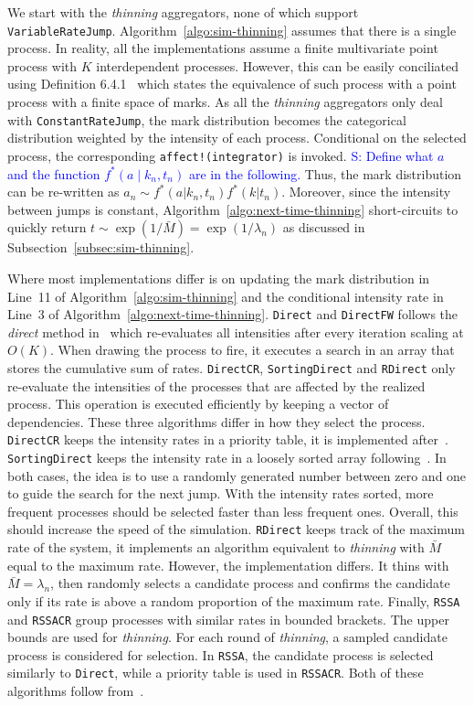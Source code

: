 \documentclass{juliacon}
\newcommand{\comment}[1]{\textcolor{blue}{#1}}
\begin{document}
We start with the \textit{thinning} aggregators, none of which support \texttt{VariableRateJump}. Algorithm~\ref{algo:sim-thinning} assumes that there is a single process. In reality, all the implementations assume a finite multivariate point process with \( K \) interdependent processes. However, this can be easily conciliated using Definition 6.4.1~\cite{daley2003} which states the equivalence of such process with a point process with a finite space of marks. As all the \textit{thinning} aggregators only deal with \texttt{ConstantRateJump}, the mark distribution becomes the categorical distribution weighted by the intensity of each process. Conditional on the selected process, the corresponding \texttt{affect!(integrator)} is invoked. \comment{S: Define what $a$ and the function $f^*(a \mid k_n, t_n)$ are in the following.} Thus, the mark distribution can be re-written as \( a_n \sim f^\ast(a | k_n, t_n)  f^\ast(k | t_n) \). Moreover, since the intensity between jumps is constant, Algorithm~\ref{algo:next-time-thinning} short-circuits to quickly return \( t \sim \exp(1 / \bar{M}) = \exp( 1 / \lambda_n ) \) as discussed in Subsection~\ref{subsec:sim-thinning}.

Where most implementations differ is on updating the mark distribution in Line~11 of Algorithm~\ref{algo:sim-thinning} and the conditional intensity rate in Line~3 of Algorithm~\ref{algo:next-time-thinning}. \texttt{Direct} and \texttt{DirectFW} follows the \textit{direct} method in~\cite{gillespie1976} which re-evaluates all intensities after every iteration scaling at \( O(K) \). When drawing the process to fire, it executes a search in an array that stores the cumulative sum of rates. \texttt{DirectCR}, \texttt{SortingDirect} and \texttt{RDirect} only re-evaluate the intensities of the processes that are affected by the realized process. This operation is executed efficiently by keeping a vector of dependencies. These three algorithms differ in how they select the process. \texttt{DirectCR} keeps the intensity rates in a priority table, it is implemented after~\cite{slepoy2008}. \texttt{SortingDirect} keeps the intensity rate in a loosely sorted array following~\cite{mccollum2006}. In both cases, the idea is to use a randomly generated number between zero and one to guide the search for the next jump. With the intensity rates sorted, more frequent processes should be selected faster than less frequent ones. Overall, this should increase the speed of the simulation. \texttt{RDirect} keeps track of the maximum rate of the system, it implements an algorithm equivalent to \textit{thinning} with \( \bar{M} \) equal to the maximum rate. However, the implementation differs. It thins with \( \bar{M} = \lambda_n \), then randomly selects a candidate process and confirms the candidate only if its rate is above a random proportion of the maximum rate. Finally, \texttt{RSSA} and \texttt{RSSACR} group processes with similar rates in bounded brackets. The upper bounds are used for \textit{thinning}. For each round of \textit{thinning}, a sampled candidate process is considered for selection. In \texttt{RSSA}, the candidate process is selected similarly to \texttt{Direct}, while a priority table is used in \texttt{RSSACR}. Both of these algorithms follow from~\cite{thanh2014,thanh2017}.
\end{document}
